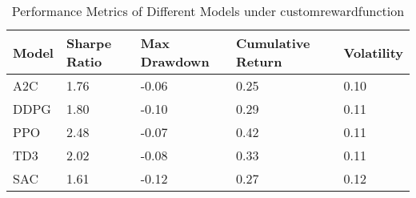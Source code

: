 \begin{table}[H]
\centering
\begin{tabular}{|l|l|l|l|l|}
\hline
Model & Sharpe Ratio & Max Drawdown & Cumulative Return & Volatility \\ \hline
A2C & 1.76 & -0.06 & 0.25 & 0.10 \\ \hline
DDPG & 1.80 & -0.10 & 0.29 & 0.11 \\ \hline
PPO & 2.48 & -0.07 & 0.42 & 0.11 \\ \hline
TD3 & 2.02 & -0.08 & 0.33 & 0.11 \\ \hline
SAC & 1.61 & -0.12 & 0.27 & 0.12 \\ \hline
\end{tabular}
\caption{Performance Metrics of Different Models under customrewardfunction}
\label{tab:metrics}
\end{table}